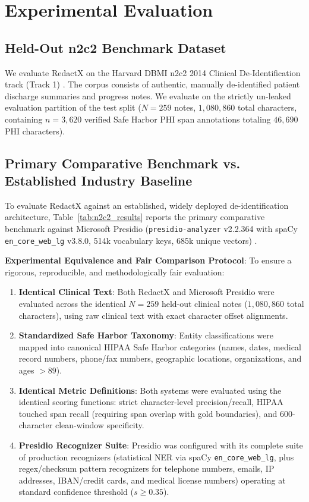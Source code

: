 \documentclass[11pt,a4paper]{article}
\begin{document}
\section{Experimental Evaluation}

\subsection{Held-Out n2c2 Benchmark Dataset}
We evaluate RedactX on the Harvard DBMI n2c2 2014 Clinical De-Identification track (Track 1) \cite{stubbs2015annotating}. The corpus consists of authentic, manually de-identified patient discharge summaries and progress notes. We evaluate on the strictly un-leaked evaluation partition of the test split ($N=259$ notes, $1,080,860$ total characters, containing $n=3,620$ verified Safe Harbor PHI span annotations totaling $46,690$ PHI characters).

\subsection{Primary Comparative Benchmark vs. Established Industry Baseline}
To evaluate RedactX against an established, widely deployed de-identification architecture, Table~\ref{tab:n2c2_results} reports the primary comparative benchmark against Microsoft Presidio (\texttt{presidio-analyzer} v2.2.364 with spaCy \texttt{en\_core\_web\_lg} v3.8.0, 514k vocabulary keys, 685k unique vectors) \cite{presidio2021}.

\noindent\textbf{Experimental Equivalence and Fair Comparison Protocol}:
To ensure a rigorous, reproducible, and methodologically fair evaluation:
\begin{enumerate}
    \item \textbf{Identical Clinical Text}: Both RedactX and Microsoft Presidio were evaluated across the identical $N=259$ held-out clinical notes ($1,080,860$ total characters), using raw clinical text with exact character offset alignments.
    \item \textbf{Standardized Safe Harbor Taxonomy}: Entity classifications were mapped into canonical HIPAA Safe Harbor categories (names, dates, medical record numbers, phone/fax numbers, geographic locations, organizations, and ages $>89$).
    \item \textbf{Identical Metric Definitions}: Both systems were evaluated using the identical scoring functions: strict character-level precision/recall, HIPAA touched span recall (requiring span overlap with gold boundaries), and 600-character clean-window specificity.
    \item \textbf{Presidio Recognizer Suite}: Presidio was configured with its complete suite of production recognizers (statistical NER via spaCy \texttt{en\_core\_web\_lg}, plus regex/checksum pattern recognizers for telephone numbers, emails, IP addresses, IBAN/credit cards, and medical license numbers) operating at standard confidence threshold ($s \ge 0.35$).
\end{enumerate}
\end{document}

